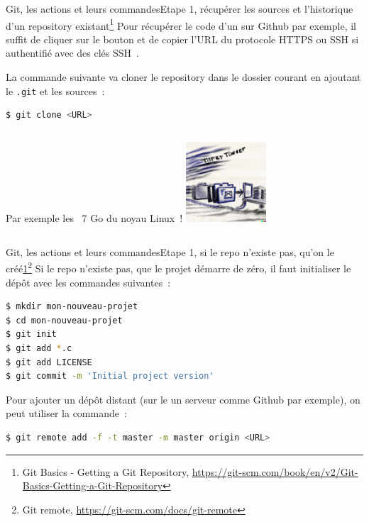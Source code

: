 \documentclass{beamer}
\begin{document}
    \begin{frame}[fragile]{Git, les actions et leurs commandes}{Etape 1, récupérer les sources et l'historique d'un repository existant\footnote{\label{progitgetrepo}Git Basics - Getting a Git Repository, \url{https://git-scm.com/book/en/v2/Git-Basics-Getting-a-Git-Repository}}}
        \transdissolve
        Pour récupérer le code d'un sur Github par exemple, il suffit de cliquer sur le bouton  et de copier l'URL du protocole HTTPS ou SSH si authentifié avec des clés SSH~.

        La commande suivante va cloner le repository dans le dossier courant en ajoutant le \lstinline{.git} et les sources~:
        \begin{lstlisting}[language=sh]
$ git clone <URL>
        \end{lstlisting}
        \begin{columns}
            Par exemple les ~7 Go du noyau Linux~!
            \centering
            \includegraphics[width=3cm]{image/git-clone-artwork}
        \end{columns}
    \end{frame}

    \begin{frame}[fragile]{Git, les actions et leurs commandes}{Etape 1, si le repo n'existe pas, qu'on le créé\cref{progitgetrepo}\footnote{Git remote, \url{https://git-scm.com/docs/git-remote}}}
        \transdissolve
        Si le repo n'existe pas, que le projet démarre de zéro, il faut initialiser le dépôt avec les commandes suivantes~:
        \begin{lstlisting}[language=sh]
$ mkdir mon-nouveau-projet
$ cd mon-nouveau-projet
$ git init
$ git add *.c
$ git add LICENSE
$ git commit -m 'Initial project version'
        \end{lstlisting}

        Pour ajouter un dépôt distant (sur le un serveur comme Github par exemple), on peut utiliser la commande~:
        \begin{lstlisting}[language=sh]
$ git remote add -f -t master -m master origin <URL>
        \end{lstlisting}
    \end{frame}
\end{document}
